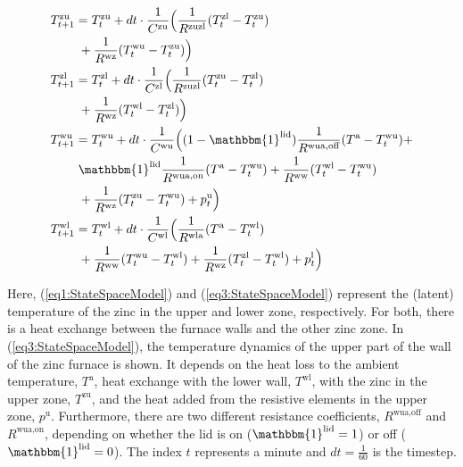 \documentclass[sigconf]{acmart}
\begin{document}
\begin{subequations}\label{eq:StateSpaceModel}
    \begin{align}
        T^{\text{zu}}_{t+1} & = T^{\text{zu}}_{t} + dt \cdot \frac{1}{C^{\text{zu}}}\Bigl( \frac{1}{R^{\text{zuzl}}} (T^{\text{zl}}_{t} - T^{\text{zu}}_{t}) \notag                                     \\ & \mspace{5mu} + \frac{1}{R^{\text{wz}}} (T^{\text{wu}}_{t} - T^{\text{zu}}_{t}) \Bigr) \label{eq1:StateSpaceModel} \\
        T^{\text{zl}}_{t+1} & = T^{\text{zl}}_{t} + dt \cdot \frac{1}{C^{\text{zl}}}\Bigl( \frac{1}{R^{\text{zuzl}}} (T^{\text{zu}}_{t} - T^{\text{zl}}_{t}) \notag                                     \\ & \mspace{5mu} + \frac{1}{R^{\text{wz}}} (T^{\text{wl}}_{t} - T^{\text{zl}}_{t}) \Bigr) \label{eq2:StateSpaceModel} \\
        T^{\text{wu}}_{t+1} & = T^{\text{wu}}_{t} + dt \cdot \frac{1}{C^{\text{wu}}}\Bigl( (1-\mathbbm{1}^{\text{lid}}) \frac{1}{R^{\text{wua},\text{off}}} (T^{\text{a}} - T^{\text{wu}}_{t}) \notag + \\ & \mspace{5mu} \mathbbm{1}^{\text{lid}} \frac{1}{R^{\text{wua},\text{on}}} (T^{\text{a}} - T^{\text{wu}}_{t}) + \frac{1}{R^{\text{ww}}} (T^{\text{wl}}_{t} - T^{\text{wu}}_{t}) \notag \\ & \mspace{5mu} + \frac{1}{R^{\text{wz}}} (T^{\text{zu}}_{t} - T^{\text{wu}}_{t}) + p^{\text{u}}_{t} \Bigr) \label{eq3:StateSpaceModel} \\
        T^{\text{wl}}_{t+1} & = T^{\text{wl}}_{t} + dt \cdot \frac{1}{C^{\text{wl}}}\Bigl( \frac{1}{R^{\text{wla}}} (T^{\text{a}} - T^{\text{wl}}_{t}) \notag                                           \\ & \mspace{5mu} + \frac{1}{R^{\text{ww}}} (T^{\text{wu}}_{t} - T^{\text{wl}}_{t}) + \frac{1}{R^{\text{wz}}} (T^{\text{zl}}_{t} - T^{\text{wl}}_{t}) + p^{\text{l}}_{t} \Bigr) \label{eq4:StateSpaceModel}
    \end{align}
\end{subequations}

Here, (\ref{eq1:StateSpaceModel}) and (\ref{eq3:StateSpaceModel}) represent the (latent) temperature of the zinc in the upper and lower zone, respectively. For both, there is a heat exchange between the furnace walls and the other zinc zone. In (\ref{eq3:StateSpaceModel}), the temperature dynamics of the upper part of the wall of the zinc furnace is shown. It depends on the heat loss to the ambient temperature, $T^{\text{a}}$, heat exchange with the lower wall, $T^{\text{wl}}$, with the zinc in the upper zone, $T^{\text{zu}}$, and the heat added from the resistive elements in the upper zone, $p^{\text{u}}$. Furthermore, there are two different resistance coefficients, $R^{\text{wua},\text{off}}$ and $R^{\text{wua},\text{on}}$, depending on whether the lid is on ($ \mathbbm{1}^{\text{lid}} = 1$) or off ($ \mathbbm{1}^{\text{lid}} = 0$). The index $t$ represents a minute and $dt = \frac{1}{60}$ is the timestep.
\end{document}
